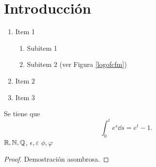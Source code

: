 \chapter{Introducción}

\lipsum[30-35]
\begin{enumerate}
    \item Item 1
          \begin{enumerate}
              \item Subitem 1
              \item Subitem 2 (ver Figura \ref{logofcfm})
          \end{enumerate}
    \item Item 2
    \item Item 3
\end{enumerate}
\begin{theorem}
    Se tiene que $$\int_0^t e^s \dd{s}=e^t-1.$$
    $\mathbb{R}, \mathbb{N}, \mathbb{Q}$,
    $\epsilon, \varepsilon$
    $\phi, \varphi$
\end{theorem}
\begin{proof}
    Demostración asombrosa.
\end{proof}
\lipsum[36-40]